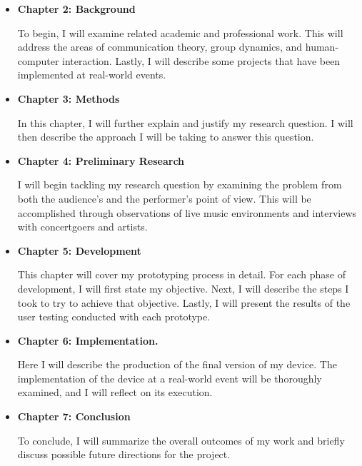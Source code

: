 \begin{itemize}
	\item \textbf{Chapter 2: Background}
	
	To begin, I will examine related academic and professional work. This will address the areas of communication theory, group dynamics, and human-computer interaction. Lastly, I will describe some projects that have been implemented at real-world events.
	
	\item \textbf{Chapter 3: Methods}
	
	In this chapter, I will further explain and justify my research question. I will then describe the approach I will be taking to answer this question.
	
	\item \textbf{Chapter 4: Preliminary Research}
	
	I will begin tackling my research question by examining the problem from both the audience's and the performer's point of view. This will be accomplished through observations of live music environments and interviews with concertgoers and artists.
	
	\item \textbf{Chapter 5: Development}
	
	This chapter will cover my prototyping process in detail. For each phase of development, I will first state my objective. Next, I will describe the steps I took to try to achieve that objective. Lastly, I will present the results of the user testing conducted with each prototype.
		
	\item \textbf{Chapter 6: Implementation.}
	
	Here I will describe the production of the final version of my device. The implementation of the device at a real-world event will be thoroughly examined, and I will reflect on its execution.
	
	\item \textbf{Chapter 7: Conclusion}
	
	To conclude, I will summarize the overall outcomes of my work and briefly discuss possible future directions for the project.
\end{itemize}
